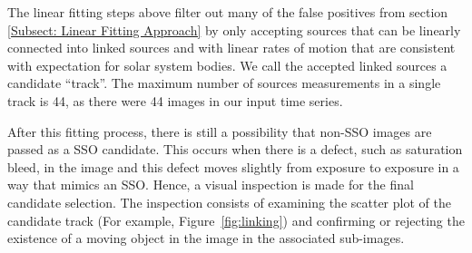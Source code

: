 
The linear fitting steps above filter out many of the false positives from section \ref{Subsect: Linear Fitting Approach} by only accepting sources that can be linearly connected into linked sources and with linear rates of motion that are consistent with expectation for solar system bodies.
We call the accepted linked sources a candidate ``track''. 
The maximum number of sources measurements in a single track is 44, as there were 44 images in our input time series.



After this fitting process, there is still a possibility that non-SSO images are passed as a SSO candidate.
This occurs when there is a defect, such as saturation bleed, in the image and this defect moves slightly from exposure to exposure in a way that mimics an SSO.
Hence, a visual inspection is made for the final candidate selection.
The inspection consists of examining the scatter plot of the candidate track (For example, Figure~\ref{fig:linking}) and confirming or rejecting the existence of a moving object in the image in the associated sub-images.

